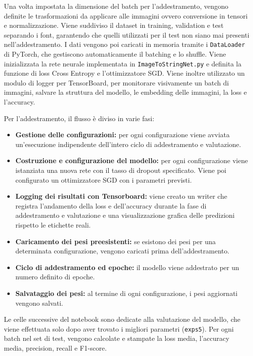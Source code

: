 Una volta impostata la dimensione del batch per l'addestramento, vengono definite le trasformazioni da applicare alle immagini ovvero conversione in tensori e normalizzazione. Viene suddiviso il dataset in training, validation e test separando i font, garantendo che quelli utilizzati per il test non siano mai presenti nell'addestramento. I dati vengono poi caricati in memoria tramite i \texttt{DataLoader} di PyTorch, che gestiscono automaticamente il batching e lo shuffle. Viene inizializzata la rete neurale implementata in \texttt{ImageToStringNet.py} e definita la funzione di loss Cross Entropy e l'ottimizzatore SGD. Viene inoltre utilizzato un modulo di logger per TensorBoard, per monitorare visivamente un batch di immagini, salvare la struttura del modello, le embedding delle immagini, la loss e l'accuracy.

Per l'addestramento, il flusso è diviso in varie fasi:
\begin{itemize}
    \item \textbf{Gestione delle configurazioni:} per ogni configurazione viene avviata un'esecuzione indipendente dell'intero ciclo di addestramento e valutazione.
    \item \textbf{Costruzione e configurazione del modello:} per ogni configurazione viene istanziata una nuova rete con il tasso di dropout specificato. Viene poi configurato un ottimizzatore SGD con i parametri previsti.
    \item \textbf{Logging dei risultati con Tensorboard:} viene creato un writer che registra l'andamento della loss e dell'accuracy durante la fase di addestramento e valutazione e una visualizzazione grafica delle predizioni rispetto le etichette reali.
    \item \textbf{Caricamento dei pesi preesistenti:} se esistono dei pesi per una determinata configurazione, vengono caricati prima dell'addestramento.
    \item \textbf{Ciclo di addestramento ed epoche:} il modello viene addestrato per un numero definito di epoche.
    \item \textbf{Salvataggio dei pesi:} al termine di ogni configurazione, i pesi aggiornati vengono salvati.
 \end{itemize}
Le celle successive del notebook sono dedicate alla valutazione del modello, che viene effettuata solo dopo aver trovato i migliori parametri (\texttt{exps5}). Per ogni batch nel set di test, vengono calcolate e stampate la loss media, l'accuracy media, precision, recall e F1-score.

